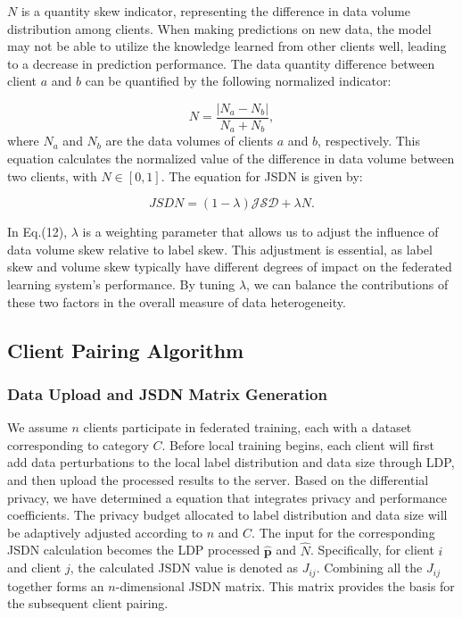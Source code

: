 \documentclass[journal,twoside,web]{ieeecolor}
\begin{document}
\( N \) is a quantity skew indicator, representing the difference in data volume distribution among clients. When making predictions on new data, the model may not be able to utilize the knowledge learned from other clients well, leading to a decrease in prediction performance. The data quantity difference between client $a$ and $b$ can be quantified by the following normalized indicator:

\begin{equation}
N = \frac{|N_a - N_b|}{N_a + N_b},
\end{equation}
where \( N_a \) and \( N_b \) are the data volumes of clients \( a \) and \( b \), respectively. This equation calculates the normalized value of the difference in data volume between two clients, with \( N \in [0, 1] \). The equation for JSDN is given by:
 
\begin{equation}
JSDN = (1-\lambda)\mathcal{JSD} + \lambda {N}.
\end{equation}

In Eq.(12), \(\lambda\) is a weighting parameter that allows us to adjust the influence of data volume skew relative to label skew. This adjustment is essential, as label skew and volume skew typically have different degrees of impact on the federated learning system's performance. By tuning \(\lambda\), we can balance the contributions of these two factors in the overall measure of data heterogeneity.

\subsection{Client Pairing Algorithm}
\subsubsection{Data Upload and JSDN Matrix Generation}

We assume $n$ clients participate in federated training, each with a dataset corresponding to category $C$. Before local training begins, each client will first add data perturbations to the local label distribution and data size through LDP, and then upload the processed results to the server. Based on the differential privacy, we have determined a equation that integrates privacy and performance coefficients. The privacy budget allocated to label distribution and data size will be adaptively adjusted according to $n$ and $C$. The input for the corresponding JSDN calculation becomes the LDP processed $\hat{\mathbf{p}}$ and  $\hat{N}$. Specifically, for client $i$ and client $j$, the calculated JSDN value is denoted as \(J_{ij}\). Combining all the \(J_{ij}\) together forms an $n$-dimensional JSDN matrix. This matrix provides the basis for the subsequent client pairing.
\end{document}
